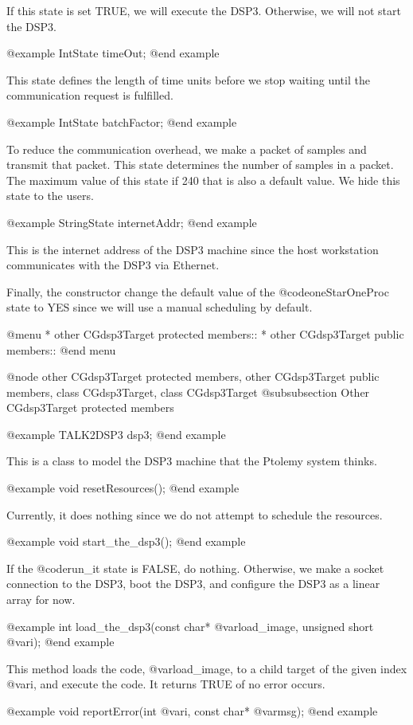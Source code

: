 {If this state is set TRUE, we will execute the DSP3. Otherwise, we will not
start the DSP3.

@example
IntState timeOut;
@end example

This state defines the length of time units before we stop waiting
until the communication request is fulfilled.

@example
IntState batchFactor;
@end example

To reduce the communication overhead, we make a packet of samples
and transmit that packet. This state determines the number of samples
in a packet. The maximum value of this state if 240 that is also
a default value. We hide this state to the users.

@example
StringState internetAddr;
@end example

This is the internet address of the DSP3 machine since the host workstation
communicates with the DSP3 via Ethernet.

Finally, the constructor change the default value of the @code{oneStarOneProc}
state to YES since we will use a manual scheduling by default.

@menu
* other CGdsp3Target protected members::
* other CGdsp3Target public members::
@end menu

@node other CGdsp3Target protected members, other CGdsp3Target public members, class CGdsp3Target, class CGdsp3Target
@subsubsection Other CGdsp3Target protected members

@example
TALK2DSP3 dsp3;
@end example

This is a class to model the DSP3 machine that the Ptolemy system thinks.

@example
void resetResources();
@end example

Currently, it does nothing since we do not attempt to schedule the resources.

@example
void start_the_dsp3();
@end example

If the @code{run_it} state is FALSE, do nothing. Otherwise, we make a
socket connection to the DSP3, boot the DSP3, and configure the DSP3 as a
linear array for now.

@example
int load_the_dsp3(const char* @var{load_image}, unsigned short @var{i});
@end example

This method loads the code, @var{load_image}, to a child target of 
the given index @var{i}, and execute the code. It returns TRUE of no
error occurs.

@example
void reportError(int @var{i}, const char* @var{msg});
@end example

}
